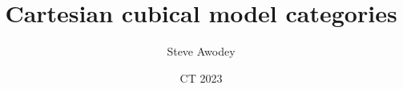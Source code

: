 \documentclass[handout]{beamer}
\makeatletter
\newcommand{\pbcorner}[1][dr]{\save*!/#1-1.2pc/#1:(-1,1)@^{|-}\restore}
\theoremstyle{remark}
\makeatother
\begin{document}

\title{Cartesian cubical model categories
}
\author{
Steve Awodey
}
\date{
CT 2023
}

\maketitle
%
%
%
\end{document}
